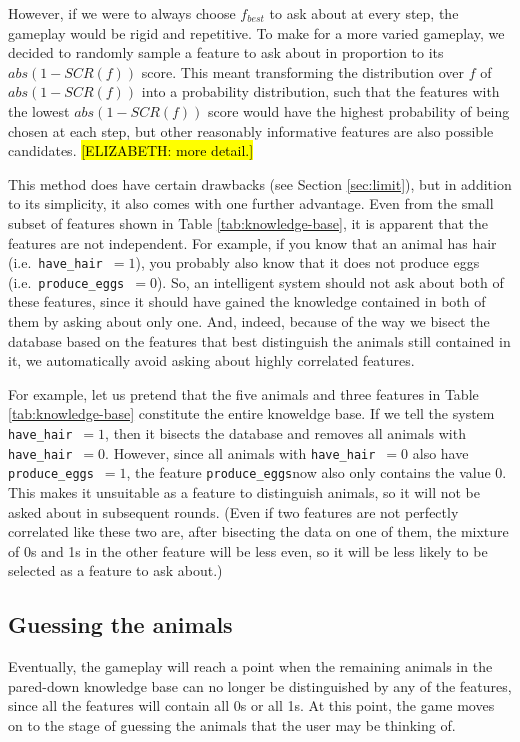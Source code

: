 \documentclass[11pt,a4paper]{article}
\newcommand{\havehair}{\texttt{have\_hair}}
\newcommand{\produceeggs}{\texttt{produce\_eggs}}
\begin{document}
However, if we were to always choose $f_{best}$ to ask about at every step, the gameplay would be rigid and repetitive.
To make for a more varied gameplay, we decided to randomly sample a feature to ask about in proportion to its $abs(1 - SCR(f))$ score. 
This meant transforming the distribution over $f$ of $abs(1 - SCR(f))$ into a probability distribution, such that the features with the lowest $abs(1 - SCR(f))$ score would have the highest probability of being chosen at each step, but other reasonably informative features are also possible candidates.
\hl{[ELIZABETH: more detail.]}

This method does have certain drawbacks (see Section \ref{sec:limit}), but in addition to its simplicity, it also comes with one further advantage.
Even from the small subset of features shown in Table \ref{tab:knowledge-base}, it is apparent that the features are not independent.
For example, if you know that an animal has hair (i.e.\ \havehair\ $= 1$), you probably also know that it does not produce eggs (i.e.\ \produceeggs\ $= 0$).
So, an intelligent system should not ask about both of these features, since it should have gained the knowledge contained in both of them by asking about only one.
And, indeed, because of the way we bisect the database based on the features that best distinguish the animals still contained in it, we automatically avoid asking about highly correlated features.

For example, let us pretend that the five animals and three features in Table \ref{tab:knowledge-base} constitute the entire knoweldge base.
If we tell the system \havehair\ $= 1$, then it bisects the database and removes all animals with \havehair\ $= 0$.
However, since all animals with \havehair\ $= 0$ also have \produceeggs\ $= 1$, the feature \produceeggs now also only contains the value 0.
This makes it unsuitable as a feature to distinguish animals, so it will not be asked about in subsequent rounds.
(Even if two features are not perfectly correlated like these two are, after bisecting the data on one of them, the mixture of 0s and 1s in the other feature will be less even, so it will be less likely to be selected as a feature to ask about.)

\subsection{Guessing the animals}
\label{subsec:guess-animals}

Eventually, the gameplay will reach a point when the remaining animals in the pared-down knowledge base can no longer be distinguished by any of the features, since all the features will contain all 0s or all 1s.
At this point, the game moves on to the stage of guessing the animals that the user may be thinking of.
\end{document}
